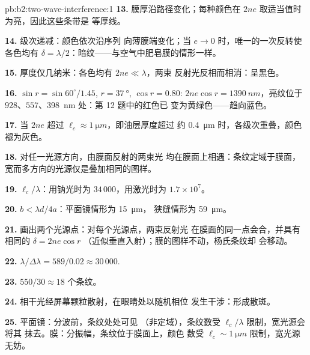 \begin{solution}{pb:b2:two-wave-interference:1}
\textbf{13.} 膜厚沿路径变化；每种颜色在 $2ne$ 取适当值时
为亮，因此这些条带是
等厚线。

\textbf{14.} 级次递减：颜色依次沿序列
向薄膜端变化；当 $e \to 0$ 时，唯一的一次反转使
各色均有 $\delta = \lambda/2$：暗纹——与空气中肥皂膜的情形一样。

\textbf{15.} 厚度仅几纳米：各色均有 $2ne \ll \lambda$，两束
反射光反相而相消：呈黑色。

\textbf{16.} $\sin r = \sin60^\circ/1.45$, $r = \qty{37}{\degree}$, $\cos r = 0.80$: $2ne\cos r
= \qty{1390}{nm}$，亮纹位于 $928$、$557$、\qty{398}{nm} 处：第 12 题中的红色已
变为黄绿色——趋向蓝色。

\textbf{17.} 当 $2ne$ 超过 $\ell_c \approx \qty{1}{\micro m}$，即油层厚度超过
约 \qty{0.4}{\micro m} 时，各级次重叠，颜色褪为灰色。

\textbf{18.} 对任一光源方向，由膜面反射的两束光
均在膜面上相遇：条纹定域于膜面，
宽而多方向的光源仅是叠加相同的图样。

\textbf{19.} $\ell_c/\lambda$：用钠光时为 $34\,000$，用激光时为 $1.7 \times 10^7$。

\textbf{20.} $b < \lambda d/4a$：平面镜情形为 \qty{15}{\micro m}，
狭缝情形为 \qty{59}{\micro m}。

\textbf{21.} 画出两个光源点：对每个光源点，两束反射光
在膜面的同一点会合，并具有相同的 $\delta = 2ne\cos r$
（近似垂直入射）；膜的图样不动，杨氏条纹却
会移动。

\textbf{22.} $\lambda/\Delta\lambda = 589/0.02 \approx 30\,000$.

\textbf{23.} $550/30 \approx 18$ 个条纹。

\textbf{24.} 相干光经屏幕颗粒散射，在眼睛处以随机相位
发生干涉：形成散斑。

\textbf{25.} 平面镜：分波前，条纹处处可见
（非定域），条纹数受 $\ell_c/\lambda$ 限制，宽光源会将其
抹去。膜：分振幅，条纹位于膜面上，颜色
数受 $\ell_c \sim \qty{1}{\micro m}$ 限制，宽光源无妨。
\end{solution}
